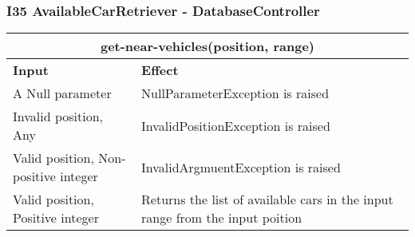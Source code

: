 \subsubsection{I35 AvailableCarRetriever - DatabaseController} 
\begin{tabular}{|p{5cm}|p{7cm}|}
\hline
\multicolumn{2}{|c|}{get-near-vehicles(position, range)} \\
\hline
\textbf{Input} & \textbf{Effect} \\

\hline
A Null parameter & NullParameterException is raised \\

\hline
Invalid position, Any & InvalidPositionException is raised \\

\hline
Valid position, Non-positive integer & InvalidArgmuentException is raised \\

\hline
Valid position, Positive integer & Returns the list of available cars in the input range from the input poition \\
\hline
\end{tabular}
